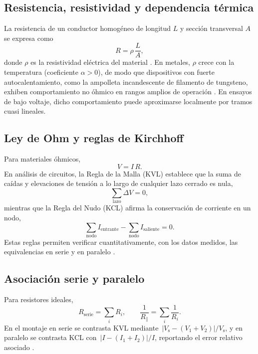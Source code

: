 \documentclass[11pt,twocolumn]{article}
\makeatletter
\let\orig@cite\cite
\renewcommand{\cite}[1]{\textcolor{Blue}{\orig@cite{#1}}}
\let\orig@parencite\parencite
\renewcommand{\parencite}[1]{\textcolor{Blue}{\orig@parencite{#1}}}
\renewcommand{\cite}[1]{\parencite{#1}}      %
\let\orig@cite\cite
\renewcommand{\cite}[1]{\textcolor{Blue}{\orig@cite{#1}}} %
\makeatother
\begin{document}
\subsection{Resistencia, resistividad y dependencia térmica}
La resistencia de un conductor homogéneo de longitud $L$ y sección transversal $A$ se expresa como
\begin{equation*}
    R = \rho\,\frac{L}{A},
\end{equation*}
donde $\rho$ es la resistividad eléctrica del material \cite{openstax-resistivity}. En metales, $\rho$ crece con la temperatura (coeficiente $\alpha>0$), de modo que dispositivos con fuerte auto\-calentamiento, como la ampolleta incandescente de filamento de tungsteno, exhiben comportamiento no óhmico en rangos amplios de operación \cite{electronics-notes-filament,physlab-incandescent}. En ensayos de bajo voltaje, dicho comportamiento puede aproximarse localmente por tramos cuasi lineales.

\subsection{Ley de Ohm y reglas de Kirchhoff}
Para materiales óhmicos,
\begin{equation*}
    V = I\,R.
\end{equation*}
En análisis de circuitos, la Regla de la Malla (KVL) establece que la suma de caídas y elevaciones de tensión a lo largo de cualquier lazo cerrado es nula,
\begin{equation*}
    \sum_{\text{lazo}} \Delta V = 0,
\end{equation*}
mientras que la Regla del Nudo (KCL) afirma la conservación de corriente en un nodo,
\begin{equation*}
    \sum_{\text{nodo}} I_{\text{entrante}} - \sum_{\text{nodo}} I_{\text{saliente}} = 0.
\end{equation*}
Estas reglas permiten verificar cuantitativamente, con los datos medidos, las equivalencias en serie y en paralelo \cite{openstax-kirchhoff}.

\subsection{Asociación serie y paralelo}
Para resistores ideales,
\begin{equation*}
    R_{\text{serie}} = \sum_{i} R_i,
    \qquad
    \frac{1}{R_{\parallel}} = \sum_{i} \frac{1}{R_i}.
\end{equation*}
En el montaje en serie se contrasta KVL mediante $\,\lvert V_{\mathrm{s}}-(V_1+V_2)\rvert/V_{\mathrm{s}}$, y en paralelo se contrasta KCL con $\,\lvert I-(I_1+I_2)\rvert/I$, reportando el error relativo asociado \cite{openstax-series-parallel}.
\end{document}
